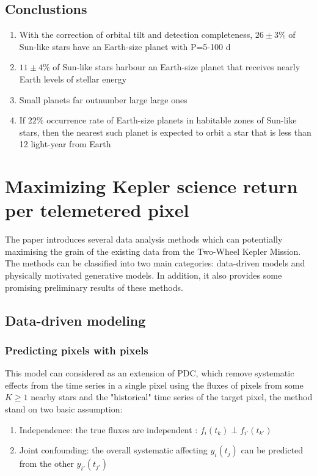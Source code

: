 \documentclass[]{article}
\begin{document}
\subsection{Conclustions}
\begin{enumerate}
 \item With the correction of orbital tilt and detection completeness, $26\pm 3\%$ of Sun-like stars have an Earth-size planet with P=5-100 d
 \item $11 \pm 4 \%$ of Sun-like stars harbour an Earth-size planet that receives nearly Earth levels of stellar energy
 \item Small planets far outnumber large large ones
 \item If $22\%$ occurrence rate of Earth-size planets in habitable zones of Sun-like stars, then the nearest such planet is expected to orbit a star that is less than 12 light-year from Earth
\end{enumerate}

\section{Maximizing Kepler science return per telemetered pixel}

The paper introduces several data analysis methods which can potentially maximising the grain of the existing data from the Two-Wheel Kepler Mission.  The methods can be classified into two main categories: data-driven models and physically motivated generative models. In addition, it also provides some promising preliminary results of these methods.

\subsection{Data-driven modeling}

\subsubsection{Predicting pixels with pixels}

This model can considered as an extension of PDC, which remove systematic effects from the time series in a single pixel using the fluxes of pixels from some $K \ge 1$ nearby stars and the "historical" time series of the target pixel, the method stand on two basic assumption:

\begin{enumerate}
  \item Independence: the true fluxes are independent : $f_{i}(t_{k})\perp f_{i'}(t_{k'})$
  \item Joint confounding: the overall systematic affecting $y_{i}(t_{j})$ can be predicted from the other $y_{i'}(t_{j'})$
\end{enumerate}
\end{document}
